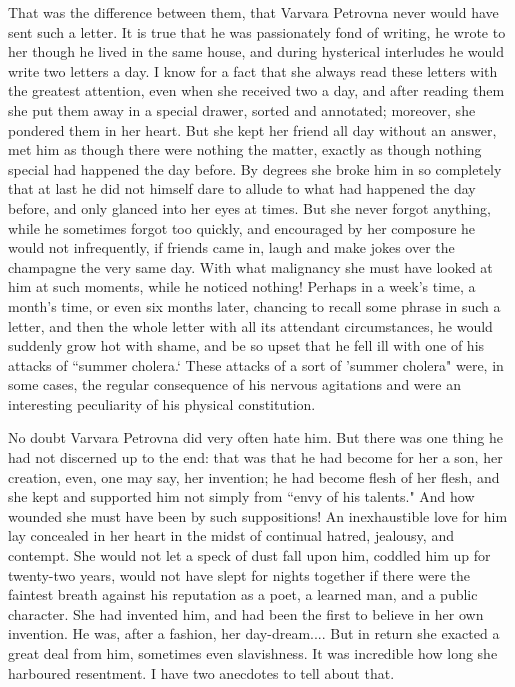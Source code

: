 \documentclass[12pt]{article}
\begin{document}
\vspace{12pt}
That was the difference between them, that Varvara Petrovna never would
have sent such a letter. It is true that he was passionately fond of
writing, he wrote to her though he lived in the same house, and during
hysterical interludes he would write two letters a day. I know for a
fact that she always read these letters with the greatest attention,
even when she received two a day, and after reading them she put them
away in a special drawer, sorted and annotated; moreover, she pondered
them in her heart. But she kept her friend all day without an answer,
met him as though there were nothing the matter, exactly as though
nothing special had happened the day before. By degrees she broke him in
so completely that at last he did not himself dare to allude to what had
happened the day before, and only glanced into her eyes at times. But
she never forgot anything, while he sometimes forgot too quickly, and
encouraged by her composure he would not infrequently, if friends came
in, laugh and make jokes over the champagne the very same day. With what
malignancy she must have looked at him at such moments, while he noticed
nothing! Perhaps in a week's time, a month's time, or even six months
later, chancing to recall some phrase in such a letter, and then the
whole letter with all its attendant circumstances, he would suddenly
grow hot with shame, and be so upset that he fell ill with one of his
attacks of ``summer cholera.` These attacks of a sort of 'summer cholera"
were, in some cases, the regular consequence of his nervous agitations
and were an interesting peculiarity of his physical constitution.


\vspace{12pt}
No doubt Varvara Petrovna did very often hate him. But there was one
thing he had not discerned up to the end: that was that he had become
for her a son, her creation, even, one may say, her invention; he had
become flesh of her flesh, and she kept and supported him not simply
from ``envy of his talents." And how wounded she must have been by such
suppositions! An inexhaustible love for him lay concealed in her heart
in the midst of continual hatred, jealousy, and contempt. She would not
let a speck of dust fall upon him, coddled him up for twenty-two years,
would not have slept for nights together if there were the faintest
breath against his reputation as a poet, a learned man, and a public
character. She had invented him, and had been the first to believe in
her own invention. He was, after a fashion, her day-dream.... But in
return she exacted a great deal from him, sometimes even slavishness. It
was incredible how long she harboured resentment. I have two anecdotes
to tell about that.
\end{document}
